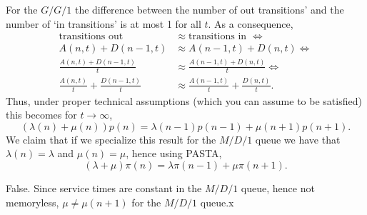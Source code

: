 \documentclass[stochastic-or.tex]{subfiles}
\begin{document}
\begin{truefalse}
For the $G/G/1$ the difference between the number of out transitions' and the number of `in transitions' is at most 1 for all $t$. As a consequence,
\begin{align*}
\text{transitions out } &\approx \text{transitions in } \iff \\
A(n,t) + D(n-1,t) &\approx A(n-1,t) + D(n,t) \iff \\
\frac{A(n,t) + D(n-1,t)}t &\approx \frac{A(n-1,t) + D(n, t)}t \iff \\
\frac{A(n,t)}t + \frac{D(n-1,t)}t &\approx \frac{A(n-1,t)}t + \frac{D(n,t)}t.
\end{align*}
Thus, under proper technical assumptions (which you can assume to be satisfied) this becomes for $t\to\infty$,
\begin{equation*}
(\lambda(n) +\mu(n))p(n) = \lambda(n-1)p(n-1) + \mu(n+1)p(n+1).
\end{equation*}
We claim that if we specialize this result for the $M/D/1$ queue we have that
$\lambda(n) = \lambda$ and $\mu(n) = \mu$, hence using PASTA,
\begin{equation*}
(\lambda +\mu)\pi(n) = \lambda\pi(n-1) + \mu\pi(n+1).
\end{equation*}
\begin{solution}
False. Since service times are constant in the $M/D/1$ queue, hence not memoryless, $\mu \neq \mu(n+1)$ for the $M/D/1$ queue.x
\end{solution}
\end{truefalse}
\end{document}
